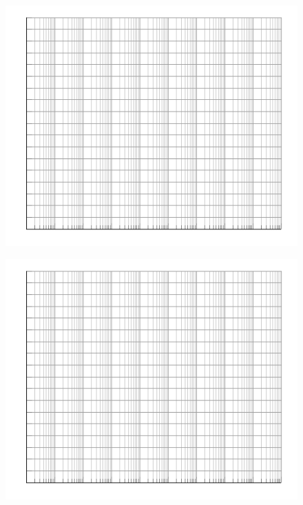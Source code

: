 \documentclass{article}
\begin{document}
    \begin{figure}
        \centering
        \includegraphics[scale=2.0]{semilog.pdf}
    \end{figure}
    \vfill
    \begin{figure}
        \centering
        \includegraphics[scale=2.0]{semilog.pdf}
    \end{figure}
    
\end{document}
